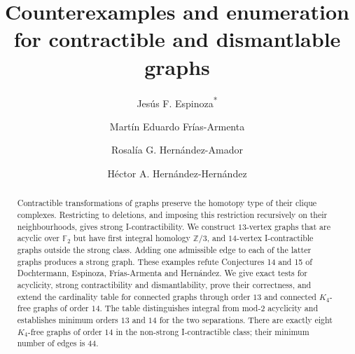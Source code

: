 \documentclass[11pt]{amsart}
\title[Counterexamples and enumeration for contractible graphs]{Counterexamples and enumeration for contractible and dismantlable graphs}
\author[J. F. Espinoza]{Jes\'us F. Espinoza\textsuperscript{*}}
\author[M. E. Fr\'ias-Armenta]{Mart\'in Eduardo Fr\'ias-Armenta}
\author[R. G. Hern\'andez-Amador]{Rosal\'ia G. Hern\'andez-Amador}
\author[H. A. Hern\'andez-Hern\'andez]{H\'ector A. Hern\'andez-Hern\'andez}
\date{}
\begin{document}
\begin{abstract}
Contractible transformations of graphs preserve the homotopy type of their
clique complexes. Restricting to deletions, and imposing this restriction recursively
on their neighbourhoods, gives strong I-contractibility. We construct
$13$-vertex graphs that are acyclic over $\mathbb F_2$ but have first
integral homology $\mathbb Z/3$, and $14$-vertex I-contractible graphs
outside the strong class. Adding one admissible edge to each of the latter
graphs produces a strong graph. These examples refute Conjectures 14 and 15
of Dochtermann, Espinoza, Fr\'ias-Armenta and Hern\'andez.
We give exact tests for acyclicity, strong contractibility and
dismantlability, prove their correctness, and extend the cardinality
table for connected graphs through order $13$ and connected
$K_4$-free graphs of order $14$.
The table distinguishes integral from mod-$2$ acyclicity and establishes
minimum orders $13$ and $14$ for the two separations. There are exactly
eight $K_4$-free graphs of order $14$ in the non-strong I-contractible
class; their minimum number of edges is $44$.
\end{abstract}
\maketitle





\appendix

\FloatBarrier



\end{document}
